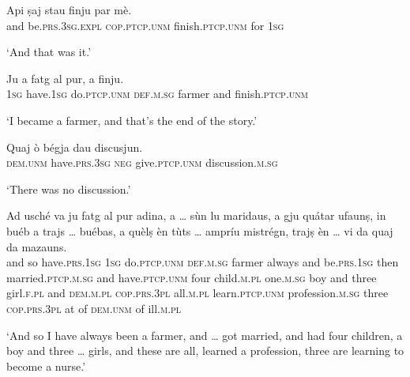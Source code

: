 \begin{linenumbers}
\gll    Api ṣaj stau finju par mè.\\
and be.\textsc{prs.3sg.expl} \textsc{cop.ptcp.unm} finish.\textsc{ptcp.unm} for \textsc{1sg}\\
\end{linenumbers}
\medskip
\glt `And that was it.'
\medskip

\begin{linenumbers}
\gll    Ju a fatg al pur, a finju.\\
 \textsc{1sg} have.\textsc{1sg} do.\textsc{ptcp.unm} \textsc{def.m.sg} farmer and finish.\textsc{ptcp.unm}  \\
\end{linenumbers}
\medskip
\glt `I became a farmer, and that’s the end of the story.'
\medskip

\begin{linenumbers}
\gll    Quaj ò bégja dau discusjun.\\
 \textsc{dem.unm} have.\textsc{prs.3sg} \textsc{neg} give.\textsc{ptcp.unm} discussion.\textsc{m.sg}\\
\end{linenumbers}
\medskip
\glt `There was no discussion.'
\medskip

\begin{linenumbers}
\gll    Ad usché va ju fatg al pur adina, a … sùn lu maridaus, a gju quátar ufaunṣ, in buéb a trajs … buébas, a quèlṣ èn tùts … ampríu mistrégn, trajṣ èn … vi da quaj da mazauns.\\
and so have.\textsc{prs.1sg} \textsc{1sg} do.\textsc{ptcp.unm} \textsc{def.m.sg} farmer always and {} be.\textsc{prs.1sg} then married.\textsc{ptcp.m.sg} and have.\textsc{ptcp.unm} four  child.\textsc{m.pl} one.\textsc{m.sg} boy and three {} girl.\textsc{f.pl} and \textsc{dem.m.pl} \textsc{cop.prs.3pl} all.\textsc{m.pl} {} learn.\textsc{ptcp.unm} profession.\textsc{m.sg} three \textsc{cop.prs.3pl} {} at of \textsc{dem.unm} of ill.\textsc{m.pl}\\
\end{linenumbers}
\medskip 
\glt `And so I have always been a farmer, and … got married, and had four children, a boy and three … girls, and these are all, learned a profession, three are learning to become a nurse.'
\medskip




